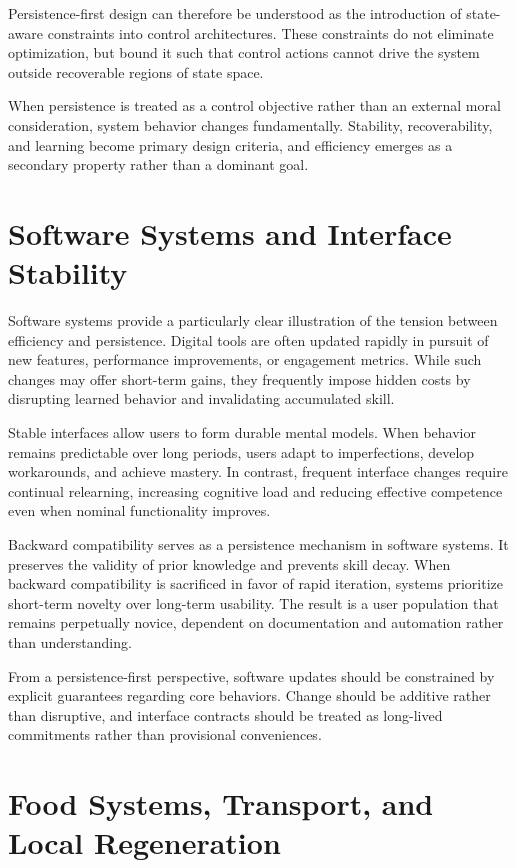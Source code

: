 \documentclass[12pt]{article} \usepackage[margin=1in]{geometry} \usepackage{setspace} \usepackage{amsmath,amssymb} \usepackage{hyperref}
\begin{document}
Persistence-first design can therefore be understood as the introduction of state-aware constraints into control architectures. These constraints do not eliminate optimization, but bound it such that control actions cannot drive the system outside recoverable regions of state space.

When persistence is treated as a control objective rather than an external moral consideration, system behavior changes fundamentally. Stability, recoverability, and learning become primary design criteria, and efficiency emerges as a secondary property rather than a dominant goal.

\section{Software Systems and Interface Stability}

Software systems provide a particularly clear illustration of the tension between efficiency and persistence. Digital tools are often updated rapidly in pursuit of new features, performance improvements, or engagement metrics. While such changes may offer short-term gains, they frequently impose hidden costs by disrupting learned behavior and invalidating accumulated skill.

Stable interfaces allow users to form durable mental models. When behavior remains predictable over long periods, users adapt to imperfections, develop workarounds, and achieve mastery. In contrast, frequent interface changes require continual relearning, increasing cognitive load and reducing effective competence even when nominal functionality improves.

Backward compatibility serves as a persistence mechanism in software systems. It preserves the validity of prior knowledge and prevents skill decay. When backward compatibility is sacrificed in favor of rapid iteration, systems prioritize short-term novelty over long-term usability. The result is a user population that remains perpetually novice, dependent on documentation and automation rather than understanding.

From a persistence-first perspective, software updates should be constrained by explicit guarantees regarding core behaviors. Change should be additive rather than disruptive, and interface contracts should be treated as long-lived commitments rather than provisional conveniences.

\section{Food Systems, Transport, and Local Regeneration}
\end{document}
